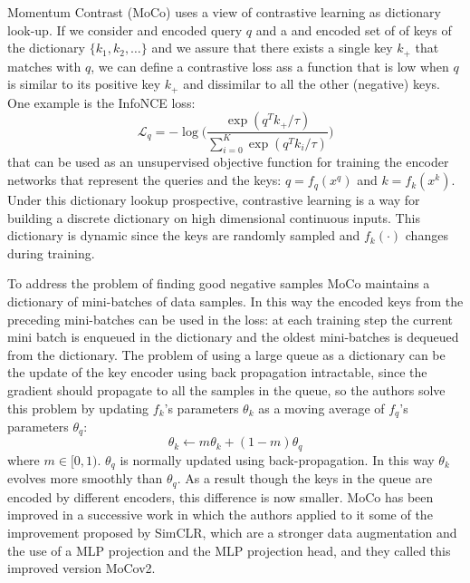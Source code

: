 Momentum Contrast (MoCo) \cite{he2020momentum} uses a view of contrastive learning as dictionary look-up. If we consider and encoded query $q$ and a and encoded set of of keys of the dictionary $\{k_1, k_2, \dots\}$ and we assure that there exists a single key $k_+$ that matches with $q$, we can define a contrastive loss ass a function that is low when $q$ is similar to its positive key $k_+$ and dissimilar to all the other (negative) keys. One example is the InfoNCE loss: 
\[ \mathcal{L}_q = - \log\Bigg( \frac{\exp(q^Tk_+/\tau)}{\sum_{i=0}^K \exp(q^T k_i/\tau)}\Bigg)\]
that can be used as an unsupervised objective function for training the encoder networks that represent the queries and the keys: $q = f_q(x^q)$ and $k = f_k(x^k)$. Under this dictionary lookup prospective, contrastive learning is a way for building a discrete dictionary on high dimensional continuous inputs. This dictionary is dynamic since the keys are randomly sampled and $f_k(\cdot)$ changes during training. 

To address the problem of finding good negative samples MoCo maintains a dictionary of mini-batches of data samples. In this way the encoded keys from the preceding mini-batches can be used in the loss: at each training step the current mini batch is enqueued in the dictionary and the oldest mini-batches is dequeued from the dictionary. The problem of using a large queue as a dictionary can be the update of the key encoder using back propagation intractable, since the gradient should propagate to all the samples in the queue, so the authors solve this problem by updating $f_k$'s parameters $\theta_k$ as a moving average of $f_q$'s parameters $\theta_q$:
\[\theta_k \leftarrow m\theta_k + (1-m)\theta_q \]
where $m \in [0,1)$. $\theta_q$ is normally updated using back-propagation. In this way $\theta_k$ evolves more smoothly than $\theta_q$. As a result though the keys in the queue are encoded by different encoders, this difference is now smaller.
MoCo has been improved in a successive work \cite{chen2020simple} in which the authors applied to it some of the improvement proposed by SimCLR, which are a stronger data augmentation and the use of a MLP projection and the MLP projection head, and they called this improved version MoCov2.